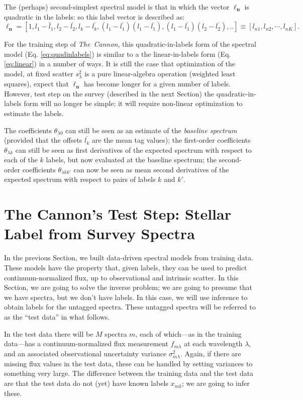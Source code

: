 \documentclass[12pt, preprint]{aastex}
\newcommand{\set}[1]{\bm{#1}}
\newcommand{\mean}[1]{\overline{#1}}
\newcommand{\tc}{\textsl{The~Cannon}}
\begin{document}
The (perhaps) second-simplest spectral model is that in which the
vector $\set{\ell_n}$ is quadratic in the labels: so this label vector is described as:
\begin{equation}
\set{\ell_n} =  [1, l_1 - \bar{l}_1, l_2 - \bar{l_2}, l_k - \bar{l_k}, (l_1 - \bar{l_1})(l_1 - \bar{l_1}), (l_1 - \bar{l_1})(l_2 - \bar{l_2}), .. ] \equiv [l_{n1}, l_{n2}, \cdots, l_{nK}].
\label{eq:quadinlabels}
\end{equation}

For the training step of \tc , this quadratic-in-labels form  of the spectral model (Eq. \ref{eq:quadinlabels}) is similar to a the linear-in-labels form (Eq. \ref{eq:linear}) in a number
of ways.
It is still the case that optimization of the model, at fixed scatter
$s_\lambda^2$ is a pure linear-algebra operation (weighted least
squares), expect that $\set{\ell_n}$ has become longer for a given number of labels. 
However, test step on the survey (described in the next Section) the quadratic-in-labels form
 will no longer be simple; it will require non-linear
optimization to estimate the labels.

The coefficients $\theta_{\lambda 0}$ can still be seen as an estimate of the
\emph{baseline spectrum} (provided that the offsets $\mean{l_k}$ are the
mean tag values); the first-order coefficients $\theta_{\lambda k}$ can still
be seen as first derivatives of the expected spectrum with respect to
each of the $k$ labels, but now evaluated at the baseline spectrum; the
second-order coefficients $\theta_{\lambda kk'}$ can now be seen as mean
second derivatives of the expected spectrum with respect to pairs of
labels $k$ and $k'$.

\section{The Cannon's Test Step: Stellar Label from Survey Spectra}
\label{sec:paramestimate}

In the previous Section, we built data-driven spectral models from training data.
These models have the property that, given labels, they can be used to
predict continuum-normalized flux, up to observational and intrinsic
scatter.
In this Section, we are going to solve the inverse problem; we
are going to presume that we have spectra, but we don't have labels.
In this case, we will use inference to obtain labels for the untagged
spectra.
These untagged spectra will be referred to as the ``test data'' in
what follows.

In the test data there will be $M$ spectra $m$, each of which---as in
the training data---has a continuum-normalized flux measurement
$f_{m\lambda}$ at each wavelength $\lambda$, and an
associated observational uncertainty variance $\sigma_{m\lambda}^2$.
Again, if there are missing flux values in the test data, these can be
handled by setting variances to something very large.
The difference between the training data and the test data are that the
test data do not (yet) have known labels $x_{mk}$; we are going to infer
these.
\end{document}
